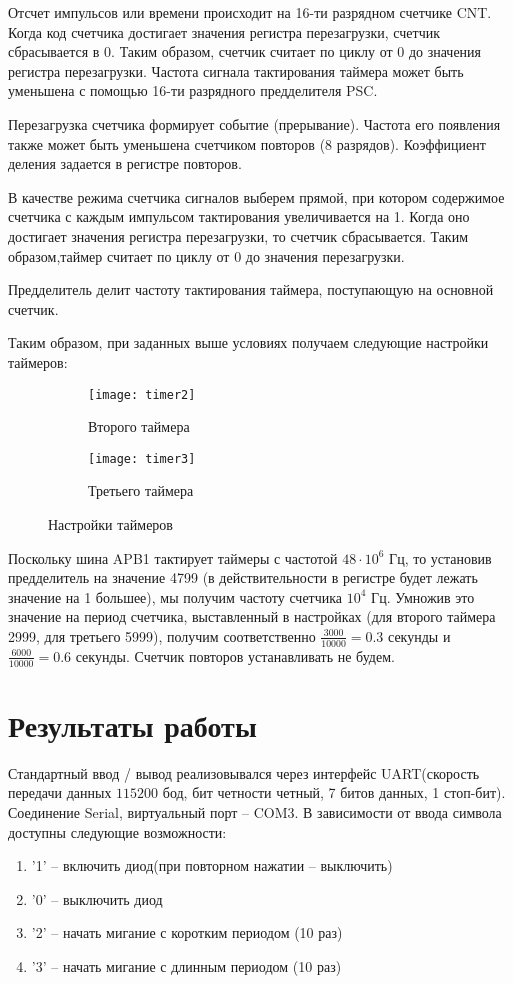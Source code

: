 Отсчет импульсов или времени происходит на 16-ти разрядном счетчике CNT. Когда код счетчика достигает значения регистра 
перезагрузки, счетчик сбрасывается в 0. Таким образом, счетчик считает по циклу от 0 до значения регистра перезагрузки.
Частота сигнала тактирования таймера может быть уменьшена с помощью 16-ти разрядного предделителя PSC.

Перезагрузка счетчика формирует событие (прерывание). Частота его появления также может быть уменьшена счетчиком повторов (8 разрядов). 
Коэффициент деления задается в регистре повторов.

В качестве режима счетчика сигналов выберем прямой, при котором  содержимое счетчика с каждым импульсом тактирования увеличивается на 1. 
Когда оно достигает значения регистра перезагрузки, то счетчик сбрасывается. Таким образом,таймер считает по циклу от 0 до значения перезагрузки. 

Предделитель делит частоту тактирования таймера, поступающую на основной счетчик.

Таким образом, при заданных выше условиях получаем следующие настройки таймеров:
\begin{figure}[H]
    \begin{subfigure}{.6\linewidth}
        \texttt{[image: timer2]}
        \caption{Второго таймера}
    \end{subfigure}
    \begin{subfigure}{.6\linewidth}
        \texttt{[image: timer3]}
        \caption{Третьего таймера}
    \end{subfigure}
    \caption{Настройки таймеров}
\end{figure}

Поскольку шина APB1 тактирует таймеры с частотой $48 \cdot 10^{6}$ Гц, то установив предделитель на значение 4799 (в 
действительности в регистре будет лежать значение на 1 большее), мы получим частоту счетчика $10^4$ Гц. Умножив это 
значение на период счетчика, выставленный в настройках (для второго таймера 2999, для третьего 5999), получим соответственно
$\frac{3000}{10000} = 0.3$ секунды и $\frac{6000}{10000} = 0.6$ секунды. Счетчик повторов устанавливать не будем.
\newpage

\section{Результаты работы}
Стандартный ввод / вывод реализовывался через интерфейс UART(скорость передачи данных $115200$ бод, бит четности четный,
7 битов данных, 1 стоп-бит). Соединение Serial, виртуальный порт -- COM3. В зависимости от ввода символа доступны следующие возможности:
\begin{enumerate}
\item '1' -- включить диод(при повторном нажатии -- выключить)
\item '0' -- выключить диод
\item '2' -- начать мигание с коротким периодом (10 раз)
\item '3' -- начать мигание с длинным периодом (10 раз)
\end{enumerate}

